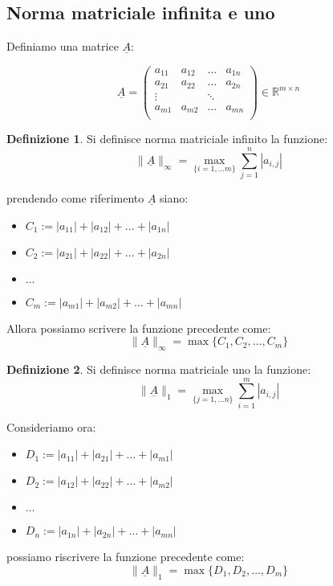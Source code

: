 \documentclass[12pt, a4paper]{book}
\theoremstyle{definition}
\newtheorem{defn}{Definizione}[section]
\newcommand{\VarMtrx}[1]{\ensuremath{\underline{#1}}}
\begin{document}
\subsection{Norma matriciale infinita e uno}
\begin{flushleft}

Definiamo una matrice $\VarMtrx{A}$: 

\[
		\VarMtrx{A} = 
								\begin{pmatrix} 
								a_{11} & a_{12} & \dots &  a_{1n} \\  
								a_{21} & a_{22} & \dots &  a_{2n} \\
								\vdots &			 & \ddots	&				\\
								a_{m1} & a_{m2} & \dots &  a_{mn} \\
								\end{pmatrix} 
		\in \mathbb{R}^{m \times n}			
\]

\begin{defn}
Si definisce norma matriciale infinito la funzione:
\[ \lVert\VarMtrx{A}\rVert_{\infty} = \max_{\{i=1,...m\}} \sum_{j=1}^{n} |a_{i,j}| \]
\end{defn}

prendendo come riferimento \VarMtrx{A} siano: 
\begin{itemize}
	\item $C_{1}:= |a_{11}| + |a_{12}| + \dots + |a_{1n}|$
	\item $C_{2}:= |a_{21}| + |a_{22}| + \dots + |a_{2n}|$
	\item $\dots$
	\item  $C_{m}:= |a_{m1}| + |a_{m2}| + \dots + |a_{mn}|$
\end{itemize}

Allora possiamo scrivere la funzione precedente come: 
\[ \lVert\VarMtrx{A}\rVert_{\infty} = \max \{ C_{1}, C_{2}, \dots,  C_{m}\}\]

\newpage
\begin{defn}
Si definisce norma matriciale uno la funzione:
\[ \lVert\VarMtrx{A}\rVert_{1} = \max_{\{j=1,...n\}} \sum_{i=1}^{m} |a_{i,j}| \]
\end{defn}

Consideriamo ora: 
\begin{itemize}
	\item  $D_{1}:= |a_{11}| + |a_{21}| + \dots + |a_{m1}|$
	\item  $D_{2}:= |a_{12}| + |a_{22}| + \dots + |a_{m2}|$
	\item $\dots$
	\item  $D_{n}:= |a_{1n}| + |a_{2n}| + \dots + |a_{mn}|$
\end{itemize}

possiamo riscrivere la funzione precedente come: 
\[ \lVert\VarMtrx{A}\rVert_{1} = \max \{ D_{1}, D_{2}, \dots,  D_{m}\}\]
\end{flushleft}
\end{document}
